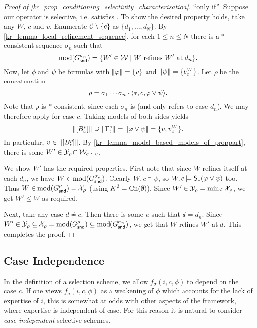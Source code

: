 \begin{proof}[Proof of \cref{kr_prop_conditioning_selectivity_characterisation}]
    ``only if'': Suppose our operator is selective, i.e. satisfies
    \boundedness{}. To show the desired property holds, take any $W$, $c$ and
    $v$. Enumerate $\C \setminus \{c\}$ as $\{d_1, \ldots, d_N\}$. By
    \cref{kr_lemma_local_refinement_sequence}, for each $1 \le n \le N$ there is a
    $\ast$-consistent sequence $\sigma_n$ such that
    \[
        \mods(G^{\sigma_n}_\snd)
        =
        \{W' \in \W \mid W \text{ refines } W' \text{ at } d_n\}.
    \]
    Now, let $\phi$ and $\psi$ be formulas with $\propmods{\phi} = \{v\}$ and
    $\propmods{\psi} = \{v^W_c\}$. Let $\rho$ be the concatenation
    \[
        \rho
        =
        \sigma_1 \cdots \sigma_n \concat
        \tuple{\ast, c, \phi \lor \psi}.
    \]
    Note that $\rho$ is $\ast$-consistent, since each $\sigma_n$ is (and only
    refers to case $d_n$). We may therefore apply \boundedness{} for case $c$.
    Taking models of both sides yields
    \[
        \propmods{\proppart{B^\rho_c}}
        \supseteq \propmods{\Gamma^\rho_c}
        = \propmods{\phi \lor \psi}
        = \{v, v^W_c\}.
    \]
    In particular, $v \in \propmods{\proppart{B^\rho_c}}$. By
    \cref{kr_lemma_model_based_models_of_proppart}, there is some $W' \in \Y_\rho
    \cap \W_{c\ :\ v}$.

    We show $W'$ has the required properties. First note that since $W$ refines
    itself at each $d_n$, we have $W \in \mods(G^{\sigma_n}_\snd)$. Clearly $W,
    c \models \psi$, so $W, c \models \S_\ast(\phi \lor \psi)$ too. Thus $W \in
    \mods(G^\rho_\snd) = \X_\rho$ (using $K^\emptyset = \cn(\emptyset)$). Since
    $W' \in \Y_\rho = \min_{\le}{\X_\rho}$, we get $W' \le W$ as required.

    Next, take any case $d \ne c$. Then there is some $n$ such that $d = d_n$.
    Since $W' \in \Y_\rho \subseteq \X_\rho = \mods(G^\rho_\snd) \subseteq
    \mods(G^{\sigma_n}_\snd)$, we get that $W$ refines $W'$ at $d$. This
    completes the proof.
\end{proof}


\subsection{Case Independence}

In the definition of a selection scheme, we allow $f_\sigma(i, c, \phi)$ to
depend on the case $c$. If one views $f_\sigma(i, c, \phi)$ as a weakening of
$\phi$ which accounts for the lack of expertise of $i$, this is somewhat at
odds with other aspects of the framework, where expertise is independent of
case. For this reason it is natural to consider \emph{case independent}
selective schemes.

